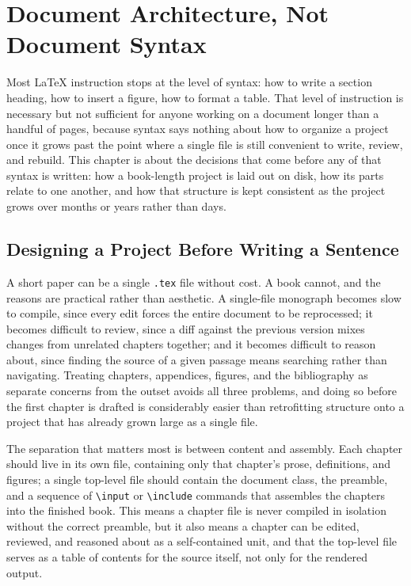 \hypertarget{chapter-3-document-architecture-not-document-syntax}{%
\chapter{Document Architecture, Not Document Syntax}\label{chapter-3-document-architecture-not-document-syntax}}

Most LaTeX instruction stops at the level of syntax: how to write a section heading, how to insert a figure, how to format a table. That level of instruction is necessary but not sufficient for anyone working on a document longer than a handful of pages, because syntax says nothing about how to organize a project once it grows past the point where a single file is still convenient to write, review, and rebuild. This chapter is about the decisions that come before any of that syntax is written: how a book-length project is laid out on disk, how its parts relate to one another, and how that structure is kept consistent as the project grows over months or years rather than days.

\hypertarget{designing-a-project-before-writing-a-sentence}{%
\section{Designing a Project Before Writing a Sentence}\label{designing-a-project-before-writing-a-sentence}}

A short paper can be a single \texttt{.tex} file without cost. A book cannot, and the reasons are practical rather than aesthetic. A single-file monograph becomes slow to compile, since every edit forces the entire document to be reprocessed; it becomes difficult to review, since a diff against the previous version mixes changes from unrelated chapters together; and it becomes difficult to reason about, since finding the source of a given passage means searching rather than navigating. Treating chapters, appendices, figures, and the bibliography as separate concerns from the outset avoids all three problems, and doing so before the first chapter is drafted is considerably easier than retrofitting structure onto a project that has already grown large as a single file.

The separation that matters most is between content and assembly. Each chapter should live in its own file, containing only that chapter's prose, definitions, and figures; a single top-level file should contain the document class, the preamble, and a sequence of \texttt{\textbackslash{}input} or \texttt{\textbackslash{}include} commands that assembles the chapters into the finished book. This means a chapter file is never compiled in isolation without the correct preamble, but it also means a chapter can be edited, reviewed, and reasoned about as a self-contained unit, and that the top-level file serves as a table of contents for the source itself, not only for the rendered output.

